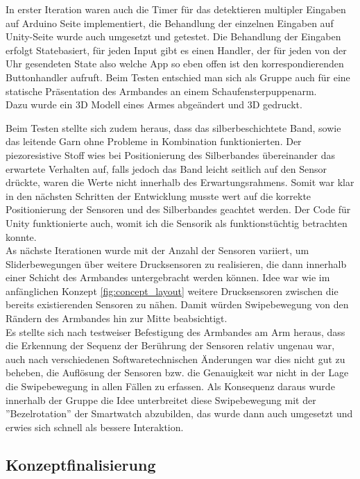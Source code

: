 \documentclass[11pt, a4paper]{article}
\begin{document}
In erster Iteration waren auch die Timer für das detektieren multipler Eingaben auf Arduino Seite implementiert, die Behandlung der einzelnen Eingaben auf Unity-Seite wurde auch umgesetzt und getestet.
Die Behandlung der Eingaben erfolgt Statebasiert, für jeden Input gibt es einen Handler, der für jeden von der Uhr gesendeten State also welche App so eben offen ist den korrespondierenden Buttonhandler aufruft.
Beim Testen entschied man sich als Gruppe auch für eine statische Präsentation des Armbandes an einem Schaufensterpuppenarm.\\
Dazu wurde ein 3D Modell eines Armes abgeändert und 3D gedruckt.


\newpage


Beim Testen stellte sich zudem heraus, dass das silberbeschichtete Band, sowie das leitende Garn ohne Probleme in Kombination funktionierten. 
Der piezoresistive Stoff wies bei Positionierung des Silberbandes übereinander das erwartete Verhalten auf, falls jedoch das Band leicht seitlich auf den Sensor drückte, waren die Werte nicht innerhalb des Erwartungsrahmens.
Somit war klar in den nächsten Schritten der Entwicklung musste wert auf die korrekte Positionierung der Sensoren und des Silberbandes geachtet werden.
Der Code für Unity funktionierte auch, womit ich die Sensorik als funktionstüchtig betrachten konnte.
\\
As nächste Iterationen wurde mit der Anzahl der Sensoren variiert, um Sliderbewegungen über weitere Drucksensoren zu realisieren, die dann innerhalb einer Schicht des Armbandes untergebracht werden können. 
Idee war wie im anfänglichen Konzept \ref{fig:concept_layout} weitere Drucksensoren zwischen die bereits existierenden Sensoren zu nähen.
Damit würden Swipebewegung von den Rändern des Armbandes hin zur Mitte beabsichtigt. \\
Es stellte sich nach testweiser Befestigung des Armbandes am Arm heraus, dass die Erkennung der Sequenz der Berührung der Sensoren relativ ungenau war, auch nach verschiedenen Softwaretechnischen Änderungen war dies nicht gut zu beheben, die Auflösung der Sensoren bzw. die Genauigkeit war nicht in der Lage die Swipebewegung in allen Fällen zu erfassen.
Als Konsequenz daraus wurde innerhalb der Gruppe die Idee unterbreitet diese Swipebewegung mit der ''Bezelrotation'' der Smartwatch abzubilden, das wurde dann auch umgesetzt und erwies sich schnell als bessere Interaktion.

\subsection{Konzeptfinalisierung}
\end{document}
